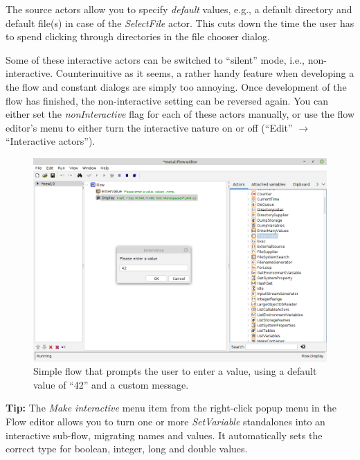 The source actors allow you to specify \textit{default} values, e.g., a
default directory and default file(s) in case of the \textit{SelectFile} actor.
This cuts down the time the user has to spend clicking through directories in
the file chooser dialog.

Some of these interactive actors can be switched to ``silent'' mode, i.e.,
non-interactive. Counterinuitive as it seems, a rather handy feature when
developing a the flow and constant dialogs are simply too annoying. Once
development of the flow has finished, the non-interactive setting can be
reversed again. You can either set the \textit{nonInteractive} flag for each of
these actors manually, or use the flow editor's menu to either turn the
interactive nature on or off (``Edit'' $\rightarrow$ ``Interactive actors'').

\begin{figure}[htb]
  \centering
  \includegraphics[width=12.0cm]{images/floweditor-interactive_actors1.png}
  \caption{Simple flow that prompts the user to enter a value, using a default
  value of ``42'' and a custom message.}
  \label{floweditor-interactive_actors1}
\end{figure}

\textbf{Tip:} The \textit{Make interactive} menu item from the right-click
popup menu in the Flow editor allows you to turn one or more \textit{SetVariable}
standalones into an interactive sub-flow, migrating names and values. It
automatically sets the correct type for boolean, integer, long and double values.

\newpage
